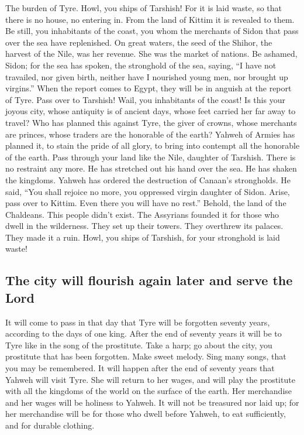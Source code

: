  The burden of Tyre. Howl, you ships of Tarshish! For it
is laid waste, so that there is no house, no entering in. From the land
of Kittim it is revealed to them.  Be still, you
inhabitants of the coast, you whom the merchants of Sidon that pass over
the sea have replenished.  On great waters, the seed of
the Shihor, the harvest of the Nile, was her revenue. She was the market
of nations.  Be ashamed, Sidon; for the sea has spoken,
the stronghold of the sea, saying, ``I have not travailed, nor given
birth, neither have I nourished young men, nor brought up virgins.''
 When the report comes to Egypt, they will be in anguish
at the report of Tyre.  Pass over to Tarshish! Wail, you
inhabitants of the coast!  Is this your joyous city, whose
antiquity is of ancient days, whose feet carried her far away to travel?
 Who has planned this against Tyre, the giver of crowns,
whose merchants are princes, whose traders are the honorable of the
earth?  Yahweh of Armies has planned it, to stain the
pride of all glory, to bring into contempt all the honorable of the
earth.  Pass through your land like the Nile, daughter of
Tarshish. There is no restraint any more.  He has
stretched out his hand over the sea. He has shaken the kingdoms. Yahweh
has ordered the destruction of Canaan's strongholds.  He
said, ``You shall rejoice no more, you oppressed virgin daughter of
Sidon. Arise, pass over to Kittim. Even there you will have no rest.''
 Behold, the land of the Chaldeans. This people didn't
exist. The Assyrians founded it for those who dwell in the wilderness.
They set up their towers. They overthrew its palaces. They made it a
ruin.  Howl, you ships of Tarshish, for your stronghold
is laid waste!

\hypertarget{the-city-will-flourish-again-later-and-serve-the-lord}{%
\subsection{The city will flourish again later and serve the
Lord}\label{the-city-will-flourish-again-later-and-serve-the-lord}}

 It will come to pass in that day that Tyre will be
forgotten seventy years, according to the days of one king. After the
end of seventy years it will be to Tyre like in the song of the
prostitute.  Take a harp; go about the city, you
prostitute that has been forgotten. Make sweet melody. Sing many songs,
that you may be remembered.  It will happen after the end
of seventy years that Yahweh will visit Tyre. She will return to her
wages, and will play the prostitute with all the kingdoms of the world
on the surface of the earth.  Her merchandise and her
wages will be holiness to Yahweh. It will not be treasured nor laid up;
for her merchandise will be for those who dwell before Yahweh, to eat
sufficiently, and for durable clothing.

